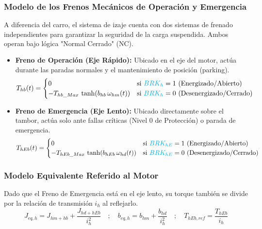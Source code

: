 \documentclass[11pt]{article}                                    %
\begin{document}
\subsubsection*{Modelo de los Frenos Mecánicos de Operación y Emergencia}
A diferencia del carro, el sistema de izaje cuenta con dos sistemas de frenado independientes para garantizar la seguridad de la carga suspendida. Ambos operan bajo lógica "Normal Cerrado" (NC).
\begin{itemize}
    \item \textbf{Freno de Operación (Eje Rápido):} Ubicado en el eje del motor, actúa durante las paradas normales y el mantenimiento de posición (parking).
    \begin{equation} \label{eq:brake_hoist_op}
        T_{hb}(t) = 
        \begin{cases} 
            0 & \text{si } \textcolor{cyan}{BRK_h} = 1 \text{ (Energizado/Abierto)} \\
            -T_{hb\_Max} \, \tanh(b_{hb} \, \omega_{hm}(t)) & \text{si } \textcolor{cyan}{BRK_h} = 0 \text{ (Desenergizado/Cerrado)}
        \end{cases}
    \end{equation}
    \item \textbf{Freno de Emergencia (Eje Lento):} Ubicado directamente sobre el tambor, actúa solo ante fallas críticas (Nivel 0 de Protección) o parada de emergencia.
    \begin{equation} \label{eq:brake_hoist_emg}
        T_{hEb}(t) = 
        \begin{cases} 
            0 & \text{si } \textcolor{cyan}{BRK_{hE}} = 1 \text{ (Energizado/Abierto)} \\
            -T_{hEb\_Max} \, \tanh(b_{hEb} \, \omega_{hd}(t)) & \text{si } \textcolor{cyan}{BRK_{hE}} = 0 \text{ (Desenergizado/Cerrado)}
        \end{cases}
    \end{equation}
\end{itemize}

\subsubsection*{Modelo Equivalente Referido al Motor}
Dado que el Freno de Emergencia está en el eje lento, su torque también se divide por la relación de transmisión $i_h$ al reflejarlo.
\begin{equation}
    J_{eq,h} = J_{hm+hb} + \frac{J_{hd+hEb}}{i_h^2}  \quad ; \quad
    b_{eq,h} = b_{hm} + \frac{b_{hd}}{i_h^2}  \quad ; \quad
    T_{hEb,ref} = \frac{T_{hEb}}{i_h}
\end{equation}
\end{document}
